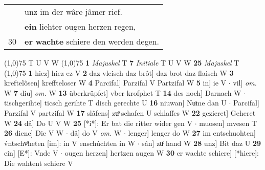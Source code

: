 \documentclass[8pt,a4paper,notitlepage]{article}
\begin{document}
\begin{table}[ht]
\begin{minipage}[t]{0.5\linewidth}
\begin{tabular}{rl}
 & unz im der wâre jâmer rief.\\ 
 & \textbf{ein} liehter ougen herzen regen,\\ 
30 & \textbf{er} \textbf{wachte} schiere den werden degen.\\ 
\end{tabular}
\scriptsize
\line(1,0){75} \newline
T U V W \newline
\line(1,0){75} \newline
\textbf{1} \textit{Majuskel} T  \textbf{7} \textit{Initiale} T U V W  \textbf{25} \textit{Majuskel} T  \newline
\line(1,0){75} \newline
\textbf{1} hiez] hiez ez V \textbf{2} daz vleisch daz brôt] daz brot daz flaisch W \textbf{3} kreftelôsen] kreffteloser W \textbf{4} Parcifal] Parzifal V Partzifal W \textbf{5} in] ie V  $\cdot$ vil] \textit{om.} W \textbf{7} diu] \textit{om.} W \textbf{13} überkrüpfet] vber krofphet T \textbf{14} des noch] Darnach W  $\cdot$ tischgerihte] ticsch gerihte T disch gerechte U \textbf{16} niuwan] Nuͦme dan U  $\cdot$ Parcifal] Parzifal V partzifal W \textbf{17} slâfens] zuͦ schafen U schlaffes W \textbf{22} gezieret] Geheret W \textbf{24} dâ] Do U V W \textbf{25} [*i*]: Er bat die ritter wider gen V  $\cdot$ muosen] mvesen T \textbf{26} diene] Die V W  $\cdot$ dâ] do V \textit{om.} W  $\cdot$ lenger] lenger do W \textbf{27} im entschuohten] v́ntschvͦheten [im]: in V enschúchten in W  $\cdot$ sân] zuͦ hand W \textbf{28} unz] Bit daz U \textbf{29} ein] [E*]: Vnde V  $\cdot$ ougen herzen] hertzen augen W \textbf{30} er wachte schiere] [*hiere]: Die wahtent schiere V \newline
\end{minipage}
\end{table}
\end{document}
